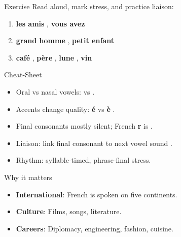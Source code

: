\cyanheader
\begin{frame}{Exercise}
Read aloud, mark stress, and practice liaison:
\begin{enumerate}
  \item \textbf{les amis} , \textbf{vous avez} \textipa{[vu zave]}
  \item \textbf{grand homme} , \textbf{petit enfant} \textipa{[p@ti tA\~{}fA\~{}]}
  \item \textbf{caf\'e} \textipa{[kafe]}, \textbf{p\`ere} \textipa{[pER]}, \textbf{lune} \textipa{[lyn]}, \textbf{vin} \textipa{[vE\~{}]}
\end{enumerate}

\medskip
{}
\end{frame}

\greenheader
\begin{frame}{Cheat-Sheet}
\begin{itemize}
  \item Oral vs nasal vowels: \textipa{[a,e,i,o,y]} vs \textipa{[A\~{},O\~{},E\~{},9\~{}]}.
  \item Accents change quality: \textbf{\'e} \textipa{[e]} vs \textbf{\`e} \textipa{[E]}.
  \item Final consonants mostly silent; French \textbf{r} is \textipa{[R]}.
  \item Liaison: link final consonant to next vowel sound .
  \item Rhythm: syllable-timed, phrase-final stress.
\end{itemize}
\end{frame}

\redheader
\begin{frame}{Why it matters}
\begin{itemize}
  \item \textbf{International}: French is spoken on five continents.
  \item \textbf{Culture}: Films, songs, literature.
  \item \textbf{Careers}: Diplomacy, engineering, fashion, cuisine.
\end{itemize}

\end{frame}

